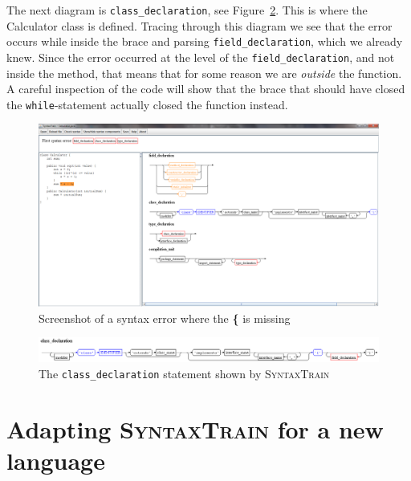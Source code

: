\documentclass[11pt]{article}
\newcommand*{\st}{\textsc{SyntaxTrain}}
\begin{document}
The next diagram is \texttt{class\_declaration}, see
Figure~\ref{calculatorClassDeclaration}. This is where the Calculator
class is defined. Tracing through this diagram we see that the error
occurs while inside the brace and parsing \texttt{field\_declaration},
which we already knew. Since the error occurred at the level of the
\texttt{field\_declaration}, and not inside the method, that means that
for some reason we are \emph{outside} the function. A careful inspection
of the code will show that the brace that should have closed the
\texttt{while}-statement actually closed the function instead.

\begin{figure}[htbp]
\begin{center}
\includegraphics[width=\textwidth,keepaspectratio=fixed]{calculatorMissingParenthesis.png}
\end{center}
\caption{Screenshot of a syntax error where the \textbf{\{} is missing}\label{calculatorMissingParenthesis}
\end{figure}

\begin{figure}[htbp]
\begin{center}
\includegraphics[width=\textwidth,keepaspectratio=fixed]{calculatorClassDeclaration.png}
\end{center}
\caption{The \texttt{class\_declaration} statement shown by \st{}}\label{calculatorClassDeclaration}
\end{figure}

\newpage

\section{Adapting \st{} for a new language}\label{s.bnf}
\end{document}

